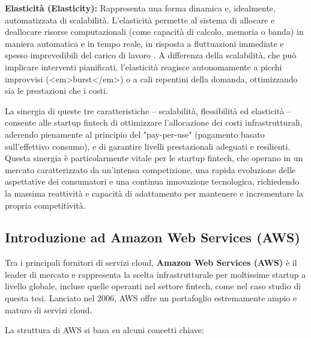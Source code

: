 \textbf{Elasticità (Elasticity):} Rappresenta una forma dinamica e, idealmente, automatizzata di scalabilità. L'elasticità permette al sistema di allocare e deallocare risorse computazionali (come capacità di calcolo, memoria o banda) in maniera automatica e in tempo reale, in risposta a fluttuazioni immediate e spesso imprevedibili del carico di lavoro \cite{cloudsurvey2019}. A differenza della scalabilità, che può implicare interventi pianificati, l'elasticità reagisce autonomamente a picchi improvvisi (<em>burst</em>) o a cali repentini della domanda, ottimizzando sia le prestazioni che i costi.

La sinergia di queste tre caratteristiche – scalabilità, flessibilità ed elasticità – consente alle startup fintech di ottimizzare l'allocazione dei costi infrastrutturali, aderendo pienamente al principio del "pay-per-use" (pagamento basato sull'effettivo consumo), e di garantire livelli prestazionali adeguati e resilienti. Questa sinergia è particolarmente vitale per le startup fintech, che operano in un mercato caratterizzato da un'intensa competizione, una rapida evoluzione delle aspettative dei consumatori e una continua innovazione tecnologica, richiedendo la massima reattività e capacità di adattamento per mantenere e incrementare la propria competitività.
\subsection{Introduzione ad Amazon Web Services (AWS)}
\label{sec:aws-intro}

Tra i principali fornitori di servizi cloud, \textbf{Amazon Web Services (AWS)} è il leader di mercato e rappresenta la scelta infrastrutturale per moltissime startup a livello globale, incluse quelle operanti nel settore fintech, come nel caso studio di questa tesi. Lanciato nel 2006, AWS offre un portafoglio estremamente ampio e maturo di servizi cloud.

La struttura di AWS si basa su alcuni concetti chiave:

